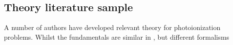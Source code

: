 \subsection{Theory literature sample\label{sec:theory-lit}}

A number of authors have developed relevant theory for photoionization problems. Whilst the fundamentals are similar in , but different formalisms 
